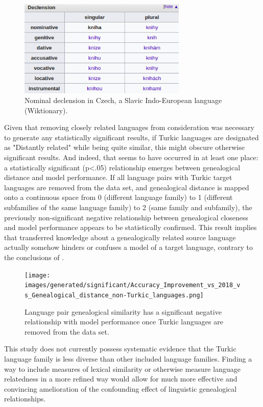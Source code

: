\begin{figure}[p]
\includegraphics[width=8cm]{images/Czech_kniha.png}
\centering
\caption{Nominal declension in Czech, a Slavic Indo-European language (Wiktionary).}
\end{figure}

\newpage

Given that removing closely related languages from consideration was necessary to generate any statistically significant results, if Turkic languages are designated as "Distantly related" while being quite similar, this might obscure otherwise significant results. And indeed, that seems to have occurred in at least one place: a statistically significant (p<.05) relationship emerges between genealogical distance and model performance. If all language pairs with Turkic target languages are removed from the data set, and genealogical distance is mapped onto a continuous space from 0 (different language family) to 1 (different subfamilies of the same language family) to 2 (same family and subfamily), the previously non-significant negative relationship between genealogical closeness and model performance appears to be statistically confirmed. This result implies that transferred knowledge about a genealogically related source language actually somehow hinders or confuses a model of a target language, contrary to the conclusions of \cite{McCarthy2019}.

\begin{figure}[ht]
\texttt{[image: images/generated/significant/Accuracy\_Improvement\_vs\_2018\_vs\_Genealogical\_distance\_non-Turkic\_languages.png]}
\centering
\caption{Language pair genealogical similarity has a significant negative relationship with model performance once Turkic languages are removed from the data set.}
\end{figure}

This study does not currently possess systematic evidence that the Turkic language family is less diverse than other included language families. Finding a way to include measures of lexical similarity or otherwise measure language relatedness in a more refined way would allow for much more effective and convincing amelioration of the confounding effect of linguistic genealogical relationships.